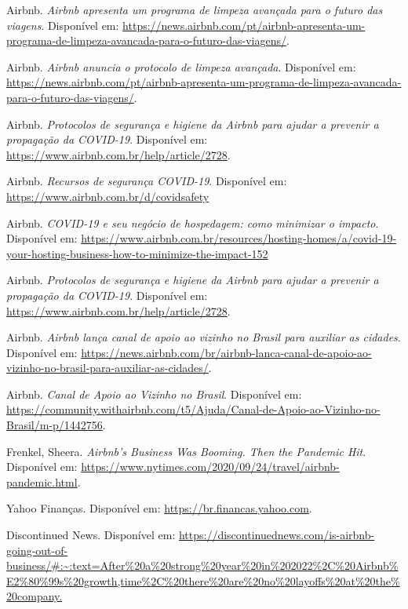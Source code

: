 \documentclass{article}
\begin{document}
Airbnb. \textit{Airbnb apresenta um programa de limpeza avançada para o futuro das viagens}. Disponível em: \url{https://news.airbnb.com/pt/airbnb-apresenta-um-programa-de-limpeza-avancada-para-o-futuro-das-viagens/}. 

Airbnb. \textit{Airbnb anuncia o protocolo de limpeza avançada}. Disponível em: \url{https://news.airbnb.com/pt/airbnb-apresenta-um-programa-de-limpeza-avancada-para-o-futuro-das-viagens/}. 

Airbnb. \textit{Protocolos de segurança e higiene da Airbnb para ajudar a prevenir a propagação da COVID-19}. Disponível em: \url{https://www.airbnb.com.br/help/article/2728}. 

Airbnb. \textit{Recursos de segurança COVID-19}. Disponível em: \url{https://www.airbnb.com.br/d/covidsafety}

Airbnb. \textit{COVID-19 e seu negócio de hospedagem: como minimizar o impacto}. Disponível em: \url{https://www.airbnb.com.br/resources/hosting-homes/a/covid-19-your-hosting-business-how-to-minimize-the-impact-152}

Airbnb. \textit{Protocolos de segurança e higiene da Airbnb para ajudar a prevenir a propagação da COVID-19}. Disponível em: \url{https://www.airbnb.com.br/help/article/2728}.

Airbnb. \textit{Airbnb lança canal de apoio ao vizinho no Brasil para auxiliar as cidades}. Disponível em: \url{https://news.airbnb.com/br/airbnb-lanca-canal-de-apoio-ao-vizinho-no-brasil-para-auxiliar-as-cidades/}.

Airbnb. \textit{Canal de Apoio ao Vizinho no Brasil}. Disponível em: \url{https://community.withairbnb.com/t5/Ajuda/Canal-de-Apoio-ao-Vizinho-no-Brasil/m-p/1442756}.

Frenkel, Sheera. \textit{Airbnb’s Business Was Booming. Then the Pandemic Hit}. Disponível em: \url{https://www.nytimes.com/2020/09/24/travel/airbnb-pandemic.html}.

Yahoo Finanças. Disponível em: \url{https://br.financas.yahoo.com}.

Discontinued News. Disponível em: \url{https://discontinuednews.com/is-airbnb-going-out-of-business/#:~:text=After\%20a\%20strong\%20year\%20in\%202022\%2C\%20Airbnb\%E2\%80\%99s\%20growth,time\%2C\%20there\%20are\%20no\%20layoffs\%20at\%20the\%20company.}
\end{document}
